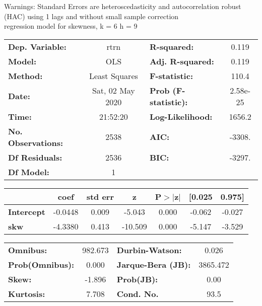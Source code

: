 Warnings: \newline
 [1] Standard Errors are heteroscedasticity and autocorrelation robust (HAC) using 1 lags and without small sample correction\\ 

regression model for skewness, k = 6 h = 9\begin{center}
\begin{tabular}{lclc}
\toprule
\textbf{Dep. Variable:}    &       rtrn       & \textbf{  R-squared:         } &     0.119   \\
\textbf{Model:}            &       OLS        & \textbf{  Adj. R-squared:    } &     0.119   \\
\textbf{Method:}           &  Least Squares   & \textbf{  F-statistic:       } &     110.4   \\
\textbf{Date:}             & Sat, 02 May 2020 & \textbf{  Prob (F-statistic):} &  2.58e-25   \\
\textbf{Time:}             &     21:52:20     & \textbf{  Log-Likelihood:    } &    1656.2   \\
\textbf{No. Observations:} &        2538      & \textbf{  AIC:               } &    -3308.   \\
\textbf{Df Residuals:}     &        2536      & \textbf{  BIC:               } &    -3297.   \\
\textbf{Df Model:}         &           1      & \textbf{                     } &             \\
\bottomrule
\end{tabular}
\begin{tabular}{lcccccc}
                   & \textbf{coef} & \textbf{std err} & \textbf{z} & \textbf{P$> |$z$|$} & \textbf{[0.025} & \textbf{0.975]}  \\
\midrule
\textbf{Intercept} &      -0.0448  &        0.009     &    -5.043  &         0.000        &       -0.062    &       -0.027     \\
\textbf{skw}       &      -4.3380  &        0.413     &   -10.509  &         0.000        &       -5.147    &       -3.529     \\
\bottomrule
\end{tabular}
\begin{tabular}{lclc}
\textbf{Omnibus:}       & 982.673 & \textbf{  Durbin-Watson:     } &    0.026  \\
\textbf{Prob(Omnibus):} &   0.000 & \textbf{  Jarque-Bera (JB):  } & 3865.472  \\
\textbf{Skew:}          &  -1.896 & \textbf{  Prob(JB):          } &     0.00  \\
\textbf{Kurtosis:}      &   7.708 & \textbf{  Cond. No.          } &     93.5  \\
\bottomrule
\end{tabular}
\end{center}

